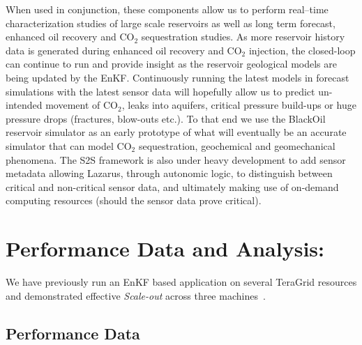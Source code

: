 \documentclass{acm_proc_article-sp}
\newcommand{\jhanote}[1]{ {\textcolor{red} { ***Jha: #1 }}}
\newcommand{\jhanote}[1]{}
\begin{document}
When used in conjunction, these components allow us to perform
real--time characterization studies of large scale reservoirs
as well as long term forecast, enhanced oil
recovery and CO$_2$ sequestration studies. As more reservoir history
data is generated during enhanced oil recovery and CO$_2$ injection,
the closed-loop can continue to run and provide insight as the
reservoir geological models are being updated by the EnKF.
Continuously running the latest models in forecast simulations with
the latest sensor data will hopefully allow us to predict un-intended
movement of CO$_2$, leaks into aquifers, critical pressure build-ups
or huge pressure drops (fractures, blow-outs etc.). To that end we use
the BlackOil reservoir simulator as an early prototype of what will
eventually be an accurate simulator that can model CO$_2$
sequestration, geochemical and geomechanical phenomena. The S2S
framework is also under heavy development to add sensor metadata
allowing Lazarus, through autonomic logic, to distinguish between
critical and non-critical sensor data, and ultimately making use of
on-demand computing resources (should the sensor data prove critical).


\section{Performance Data and Analysis:} 

We have previously run an EnKF based application on several TeraGrid
resources and demonstrated effective {\it Scale-out} across three
machines~\cite{gmac}.  %

\subsection{Performance Data} 
\end{document}
